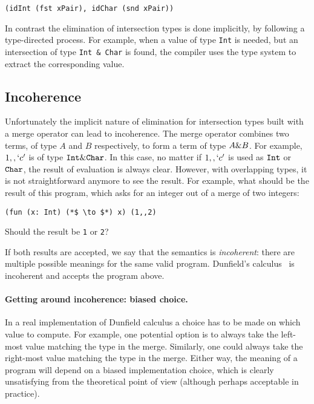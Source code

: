 \begin{lstlisting}
(idInt (fst xPair), idChar (snd xPair))
\end{lstlisting}

\noindent In contrast the elimination of intersection types is done
implicitly, by following a type-directed process. For example,
when a value of type \lstinline{Int} is needed, but an intersection
of type \lstinline{Int & Char} is found, the compiler uses the
type system to extract the corresponding value.

\subsection{Incoherence}\label{subsec:incoherence}
Unfortunately the implicit nature of elimination for intersection
types built with a merge operator can lead to incoherence.
The merge operator combines two terms, of type $A$ and $B$
respectively, to form a term of type $A \& B$. For example,
$1 ,, `c'$ is of type $\texttt{Int} \& \texttt{Char}$. In this case, no
matter if $1 ,, `c'$ is used as $\texttt{Int}$ or $\texttt{Char}$, the result
of evaluation is always clear. However, with overlapping types, it is
not straightforward anymore to see the result. For example, what
should be the result of this program, which asks for an integer out of
a merge of two integers:
\begin{lstlisting}
(fun (x: Int) (*$ \to $*) x) (1,,2)
\end{lstlisting}
Should the result be \lstinline$1$ or \lstinline$2$?

If both results are accepted, we say that the semantics is \emph{incoherent}:
there are multiple possible meanings for the same valid program. Dunfield's
calculus~\cite{dunfield2014elaborating} is incoherent and accepts the program
above.

\paragraph{Getting around incoherence: biased choice.}
In a real implementation of Dunfield calculus a choice has to be made
on which value to compute. For example, one potential option is to
always take the left-most value matching the type in the
merge. Similarly, one could always take the right-most
value matching the type in the merge. Either way, the meaning
of a program will depend on a biased implementation choice,
which is clearly unsatisfying from the theoretical point of view
(although perhaps acceptable in practice).

